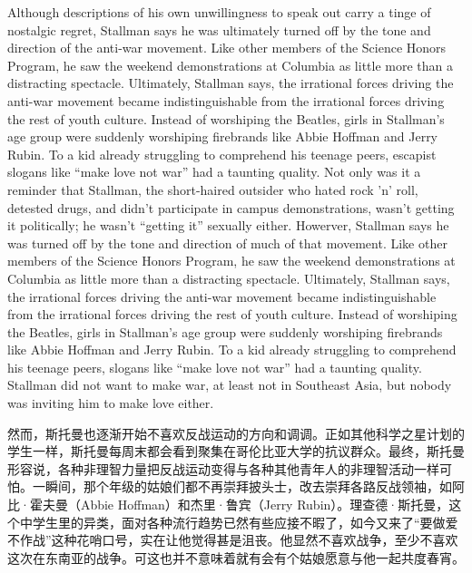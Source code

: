\ifdefined\eng
\ifdefined\vone
Although descriptions of his own unwillingness to speak out carry a tinge of nostalgic regret, Stallman says he was ultimately turned off by the tone and direction of the anti-war movement. Like other members of the Science Honors Program, he saw the weekend demonstrations at Columbia as little more than a distracting spectacle. Ultimately, Stallman says, the irrational forces driving the anti-war movement became indistinguishable from the irrational forces driving the rest of youth culture. Instead of worshiping the Beatles, girls in Stallman's age group were suddenly worshiping firebrands like Abbie Hoffman and Jerry Rubin. To a kid already struggling to comprehend his teenage peers, escapist slogans like ``make love not war'' had a taunting quality. Not only was it a reminder that Stallman, the short-haired outsider who hated rock 'n' roll, detested drugs, and didn't participate in campus demonstrations, wasn't getting it politically; he wasn't ``getting it'' sexually either.
\fi
\ifdefined\vtwo
Howerver, Stallman says he was turned off by the tone and direction of much of that movement. Like other members of the Science Honors Program, he saw the weekend demonstrations at Columbia as little more than a distracting spectacle. Ultimately, Stallman says, the irrational forces driving the anti-war movement became indistinguishable from the irrational forces driving the rest of youth culture. Instead of worshiping the Beatles, girls in Stallman's age group were suddenly worshiping firebrands like Abbie Hoffman and Jerry Rubin. To a kid already struggling to comprehend his teenage peers, slogans like ``make love not war'' had a taunting quality. Stallman did not want to make war, at least not in Southeast Asia, but nobody was inviting him to make love either.
\fi

\ifdefined\chs
然而，斯托曼也逐渐开始不喜欢反战运动的方向和调调。正如其他科学之星计划的学生一样，斯托曼每周末都会看到聚集在哥伦比亚大学的抗议群众。最终，斯托曼形容说，各种非理智力量把反战运动变得与各种其他青年人的非理智活动一样可怕。一瞬间，那个年级的姑娘们都不再崇拜披头士，改去崇拜各路反战领袖，如阿比·霍夫曼（Abbie Hoffman）和杰里·鲁宾（Jerry Rubin）。理查德·斯托曼，这个中学生里的异类，面对各种流行趋势已然有些应接不暇了，如今又来了``要做爱不作战''这种花哨口号，实在让他觉得甚是沮丧。他显然不喜欢战争，至少不喜欢这次在东南亚的战争。可这也并不意味着就有会有个姑娘愿意与他一起共度春宵。
\fi

